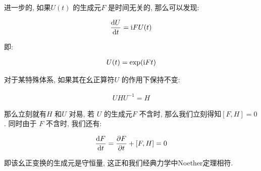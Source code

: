 进一步的, 如果$U(t)$ 的生成元$F$ 是时间无关的, 那么可以发现:

\begin{equation}
  \begin{aligned}
    \dv{U}{t} = {\rm i} F U(t)
  \end{aligned}
\end{equation}

即:

\begin{equation}
  \begin{aligned}
    U(t) = \exp({\rm i} F t)
  \end{aligned}
\end{equation}

\begin{remark}
  对于某特殊体系, 如果其在幺正算符$U$ 的作用下保持不变:

  \begin{equation}
    \begin{aligned}
      UHU^{-1} = H
    \end{aligned}
  \end{equation}

  那么立刻就有$H$ 和$U$ 对易, 若 $U$ 的生成元$F$ 不含时, 那么我们立刻得知$[F,H]=0$. 同时由于
   $F$ 不含时, 我们还有:

   \begin{equation}
     \begin{aligned}
       \dv{F}{t} = \pdv{F}{t} + [F, H] = 0
     \end{aligned}
   \end{equation}

   即该幺正变换的生成元是守恒量, 这正和我们经典力学中Noether定理相符.

\end{remark}
